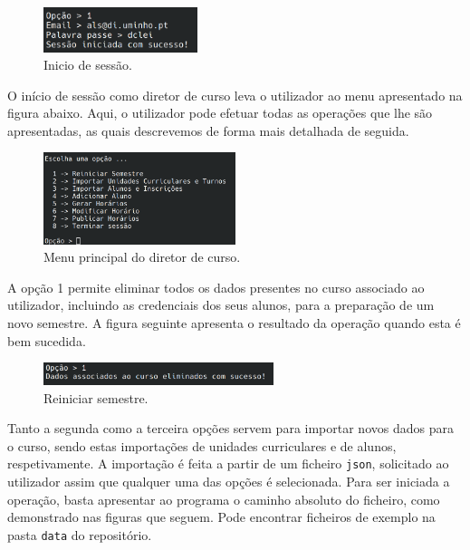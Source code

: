\documentclass[12pt, a4paper]{article}
\begin{document}
\begin{figure}[H]
    \centering
    \includegraphics[width=0.4\textwidth]{Imagens/Manual/IniciarSessao-1.png}
    \caption{Inicio de sessão.}
\end{figure}

O início de sessão como diretor de curso leva o utilizador ao menu apresentado na figura abaixo.
Aqui, o utilizador pode efetuar todas as operações que lhe são apresentadas, as quais descrevemos de
forma mais detalhada de seguida.

\begin{figure}[H]
    \centering
    \includegraphics[width=0.5\textwidth]{Imagens/Manual/DiretorCurso.png}
    \caption{Menu principal do diretor de curso.}
    \label{menudiretor}
\end{figure}

A opção 1 permite eliminar todos os dados presentes no curso associado ao utilizador, incluindo as
credenciais dos seus alunos, para a preparação de um novo semestre. A figura seguinte apresenta o
resultado da operação quando esta é bem sucedida.

\begin{figure}[H]
    \centering
    \includegraphics[width=0.6\textwidth]{Imagens/Manual/DiretorCurso-1.png}
    \caption{Reiniciar semestre.}
\end{figure}

Tanto a segunda como a terceira opções servem para importar novos dados para o curso, sendo estas
importações de unidades curriculares e de alunos, respetivamente. A importação é feita a partir de
um ficheiro \texttt{json}, solicitado ao utilizador assim que qualquer uma das opções é
selecionada. Para ser iniciada a operação, basta apresentar ao programa o caminho absoluto do
ficheiro, como demonstrado nas figuras que seguem. Pode encontrar ficheiros de exemplo na pasta
\texttt{data} do repositório.
\end{document}
